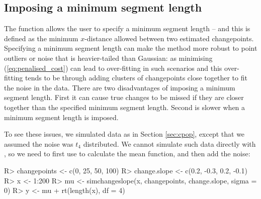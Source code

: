 \documentclass[article]{jss}
\begin{document}
\subsection{Imposing a minimum segment length}

The  function allows the user to specify a minimum segment length -- and this is defined as the minimum $x$-distance allowed between two estimated changepoints. Specifying a minimum segment length can make the method more robust to point outliers or noise that is heavier-tailed than Gaussian: as minimising (\ref{eq:penalised_cost}) can lead to over-fitting in such scenarios and this over-fitting tends to be through adding clusters of changepoints close together to fit the noise in the data. There are two disadvantages of imposing a minimum segment length. First it can cause true changes to be missed if they are closer together than the specified minimum segment length. Second  is slower when a minimum segment length is imposed.

To see these issues, we simulated data as in Section \ref{sec:cpop}, except that we assumed the noise was $t_4$ distributed. We cannot simulate such data directly with , so we need to first use  to calculate the mean function, and then add the noise:

\begin{CodeChunk}
\begin{CodeInput}
R> changepoints <- c(0, 25, 50, 100)
R> change.slope <- c(0.2, -0.3, 0.2, -0.1)
R> x <- 1:200
R> mu <- simchangeslope(x, changepoints, change.slope, sigma = 0)
R> y <- mu + rt(length(x), df = 4)
\end{CodeInput}
\end{CodeChunk}
\end{document}
